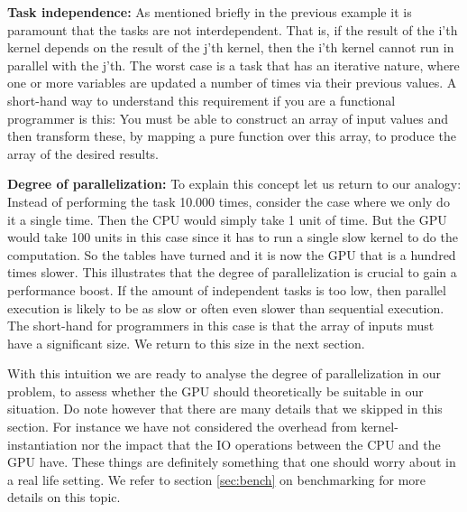 \textbf{Task independence:} As mentioned briefly in the previous example it is paramount that the tasks are not interdependent. That is, if the result of the i'th kernel depends on the result of the j'th kernel, then the i'th kernel cannot run in parallel with the j'th. The worst case is a task that has an iterative nature, where one or more variables are updated a number of times via their previous values. A short-hand way to understand this requirement if you are a functional programmer is this: You must be able to construct an array of input values and then transform these, by mapping a pure function over this array, to produce the array of the desired results.

\textbf{Degree of parallelization:} To explain this concept let us return to our analogy:
Instead of performing the task 10.000 times, consider the case where we only do it a single time. Then the CPU would simply take 1 unit of time. But the GPU would take 100 units in this case since it has to run a single slow kernel to do the computation. So the tables have turned and it is now the GPU that is a hundred times slower. This illustrates that the degree of parallelization is crucial to gain a performance boost. If the amount of independent tasks is too low, then parallel execution is likely to be as slow or often even slower than sequential execution. The short-hand for programmers in this case is that the array of inputs must have a significant size. We return to this size in the next section.

With this intuition we are ready to analyse the degree of parallelization in our problem, to assess whether the GPU should theoretically be suitable in our situation. Do note however that there are many details that we skipped in this section. For instance we have not considered the overhead from kernel-instantiation nor the impact that the IO operations between the CPU and the GPU have. These things are definitely something that one should worry about in a real life setting. We refer to section \ref{sec:bench} on benchmarking for more details on this topic.

